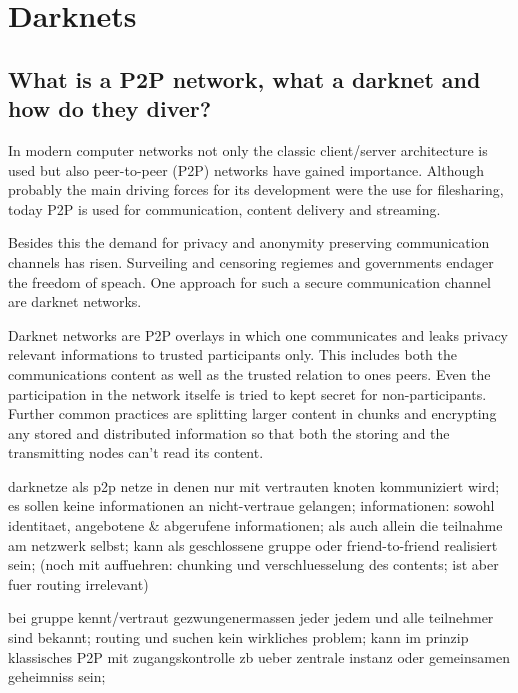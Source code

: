 \chapter{Darknets}

\section{What is a P2P network, what a darknet and how do they diver?}

In modern computer networks not only the classic client/server architecture is used but also peer-to-peer (P2P) networks have gained importance. Although probably the main driving forces for its development were the use for filesharing, today P2P is used for communication, content delivery and streaming.

Besides this the demand for privacy and anonymity preserving communication channels has risen. Surveiling and censoring regiemes and governments endager the freedom of speach. One approach for such a secure communication channel are darknet networks.

Darknet networks are P2P overlays in which one communicates and leaks privacy relevant informations to trusted participants only. This includes both the communications content as well as the trusted relation to ones peers. Even the participation in the network itselfe is tried to kept secret for non-participants. Further common practices are splitting larger content in chunks and encrypting any stored and distributed information so that both the storing and the transmitting nodes can't read its content.


darknetze als p2p netze in denen nur mit vertrauten knoten kommuniziert wird; es sollen keine informationen an nicht-vertraue gelangen; informationen: sowohl identitaet, angebotene & abgerufene informationen; als auch allein die teilnahme am netzwerk selbst; kann als geschlossene gruppe oder friend-to-friend realisiert sein; (noch mit auffuehren: chunking und verschluesselung des contents; ist aber fuer routing irrelevant)

bei gruppe kennt/vertraut gezwungenermassen jeder jedem und alle teilnehmer sind bekannt; routing und suchen kein wirkliches problem; kann im prinzip klassisches P2P mit zugangskontrolle zb ueber zentrale instanz oder gemeinsamen geheimniss sein;

